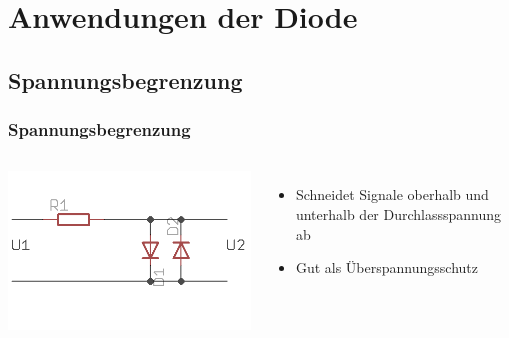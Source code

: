 \section*{Anwendungen der Diode}

\subsection*{Spannungs\-begrenzung}
\begin{frame}
  \frametitle{Spannungsbegrenzung}
  \begin{columns}[c]
    \begin{center}
      \includegraphics[width=1\textwidth]{a05/spannungsBegrenz.png}\\
      \tiny \hyperlink{refs}{\cite{wm}}
    \end{center}
    \begin{itemize}
      \item Schneidet Signale oberhalb und unterhalb der Durchlassspannung ab
      \item Gut als Überspannungsschutz
    \end{itemize}
  \end{columns}
\end{frame}


